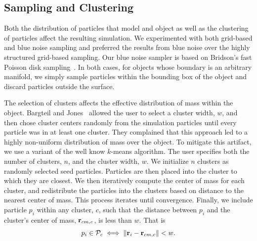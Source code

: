 \documentclass[review]{acmsiggraph}
\begin{document}
\subsection{Sampling and Clustering}

Both the distribution of particles that model and object as well as the
clustering of particles affect the resulting simulation.  We
experimented with both grid-based and blue noise sampling and
preferred the results from blue noise over the highly structured grid-based sampling.
Our blue noise sampler is based on Bridson's fast Poisson disk
sampling~\cite{Bridson:2007:FPD}.  In both cases, for objects whose
boundary is an arbitrary manifold, we simply sample particles within
the bounding box of the object and discard particles outside
the surface.

The selection of clusters affects the effective distribution of mass 
within the object.  Bargteil and Jones~
allowed the user to select a cluster width, $w$, and then
chose cluster centers randomly from the simulation particles until every particle
was in at least one cluster.  They complained that this approach led
to a highly non-uniform distribution of mass over the object.  
To mitigate this artifact, we use a variant of the
well know $k$-means algorithm.  The user specifies both the
number of clusters, $n$, and the cluster width, $w$.
We initialize $n$ clusters as randomly selected seed particles.
Particles are then placed into the cluster to which they are closest.
We then iteratively compute the center of mass for each cluster, and
redistribute the particles into the clusters based on distance to the
nearest center of mass.  This process iterates until 
convergence.  Finally, we include particle $p_i$ within any cluster, $c$,
such that the distance between $p_i$ and the cluster's center
of mass, $\mathit{\mathbf{r}}_{cm,c}$, is less than $w$.  That is
\begin{equation}
p_i\in\mathcal{P}_c \iff \|\mathit{\mathbf{r}}_i-\mathit{\mathbf{r}}_{cm,c}\| < w.
\end{equation}

\end{document}
